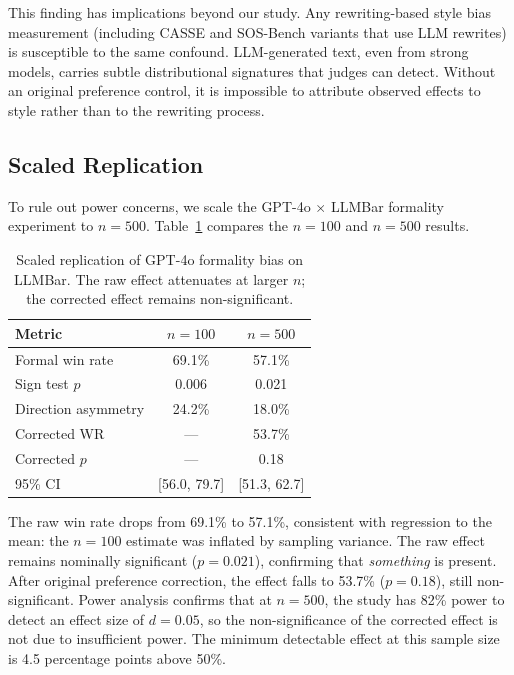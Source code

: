 \documentclass[11pt,a4paper]{article}
\begin{document}
This finding has implications beyond our study.
Any rewriting-based style bias measurement (including CASSE and SOS-Bench variants that use LLM rewrites) is susceptible to the same confound.
LLM-generated text, even from strong models, carries subtle distributional signatures that judges can detect.
Without an original preference control, it is impossible to attribute observed effects to style rather than to the rewriting process.

\subsection{Scaled Replication}
\label{sec:scaled}

To rule out power concerns, we scale the GPT-4o $\times$ LLMBar formality experiment to $n=500$.
Table~\ref{tab:scaled} compares the $n=100$ and $n=500$ results.

\begin{table}[t]
\centering
\caption{Scaled replication of GPT-4o formality bias on LLMBar. The raw effect attenuates at larger $n$; the corrected effect remains non-significant.}
\label{tab:scaled}
\small
\begin{tabular}{lcc}
\toprule
\textbf{Metric} & \textbf{$n=100$} & \textbf{$n=500$} \\
\midrule
Formal win rate & 69.1\% & 57.1\% \\
Sign test $p$ & 0.006 & 0.021 \\
Direction asymmetry & 24.2\% & 18.0\% \\
Corrected WR & --- & 53.7\% \\
Corrected $p$ & --- & 0.18 \\
95\% CI & [56.0, 79.7] & [51.3, 62.7] \\
\bottomrule
\end{tabular}
\end{table}

The raw win rate drops from 69.1\% to 57.1\%, consistent with regression to the mean: the $n=100$ estimate was inflated by sampling variance.
The raw effect remains nominally significant ($p=0.021$), confirming that \emph{something} is present.
After original preference correction, the effect falls to 53.7\% ($p=0.18$), still non-significant.
Power analysis confirms that at $n=500$, the study has 82\% power to detect an effect size of $d=0.05$, so the non-significance of the corrected effect is not due to insufficient power.
The minimum detectable effect at this sample size is 4.5 percentage points above 50\%.
\end{document}
